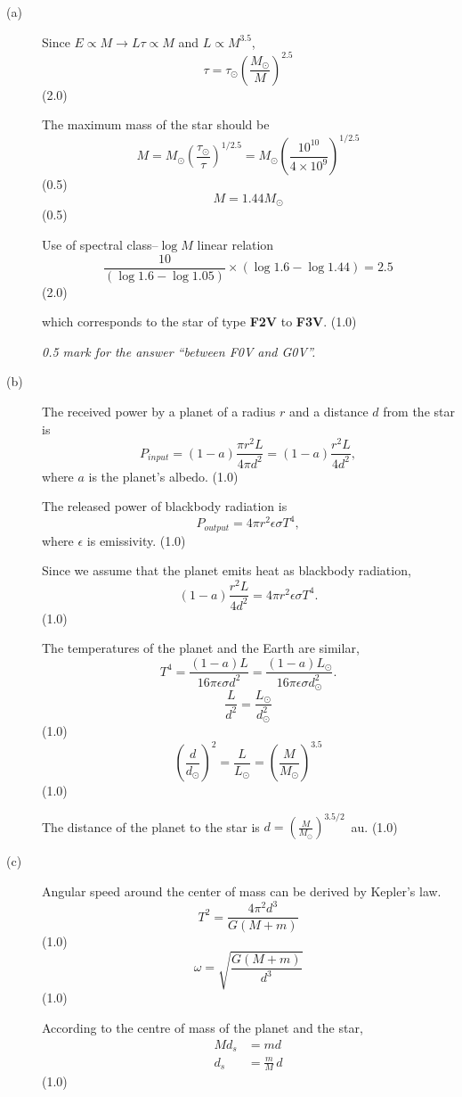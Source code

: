 \begin{description}
\item[(a)] Since $E \propto M \rightarrow L\tau \propto M$ and
$L \propto M^{3.5}$,
\[ \tau = \tau_\odot\left(\frac{M_\odot}{M}\right)^{2.5} \]
\hfill(2.0)

The maximum mass of the star should be
\[ M = M_\odot\left(\frac{\tau_\odot}{\tau}\right)^{1/2.5}
     = M_\odot\left(\frac{10^{10}}{4\times10^{9}}\right)^{1/2.5} \]
\hfill(0.5)
\[ M = 1.44 M_\odot \]
\hfill(0.5)

Use of spectral class--$\log M$ linear relation
\[ \frac{10}{(\log 1.6 - \log 1.05)}\times(\log 1.6 - \log 1.44) = 2.5 \]
\hfill(2.0)

which corresponds to the star of type \textbf{F2V} to \textbf{F3V}. \hfill(1.0)

\textit{0.5 mark for the answer ``between F0V and G0V''.}

\item[(b)] The received power by a planet of a radius $r$ and a distance $d$
from the star is
\[ P_{input} = (1-a)\frac{\pi r^2 L}{4\pi d^2} = (1-a)\frac{r^2 L}{4d^2}, \]
where $a$ is the planet's albedo. \hfill(1.0)

The released power of blackbody radiation is
\[ P_{output} = 4\pi r^2\epsilon\sigma T^4, \]
where $\epsilon$ is emissivity. \hfill(1.0)

Since we assume that the planet emits heat as blackbody radiation,
\[ (1-a)\frac{r^2 L}{4d^2} = 4\pi r^2\epsilon\sigma T^4. \]
\hfill(1.0)

The temperatures of the planet and the Earth are similar,
\[ T^4 = \frac{(1-a)L}{16\pi\epsilon\sigma d^2}
       = \frac{(1-a)L_\odot}{16\pi\epsilon\sigma d_\odot^2}. \]
\[ \frac{L}{d^2} = \frac{L_\odot}{d_\odot^2} \]
\hfill(1.0)
\[ \left(\frac{d}{d_\odot}\right)^2 = \frac{L}{L_\odot}
   = \left(\frac{M}{M_\odot}\right)^{3.5} \]
\hfill(1.0)

The distance of the planet to the star is
$d = \left(\frac{M}{M_\odot}\right)^{3.5/2}$~au. \hfill(1.0)

\item[(c)] Angular speed around the center of mass can be derived by Kepler's
law.
\[ T^2 = \frac{4\pi^2 d^3}{G(M+m)} \]
\hfill(1.0)
\[ \omega = \sqrt{\frac{G(M+m)}{d^3}} \]
\hfill(1.0)

According to the centre of mass of the planet and the star,
\begin{align*}
Md_s &= md\\
d_s &= \frac{m}{M}\,d
\end{align*}
\hfill(1.0)


\end{description}
